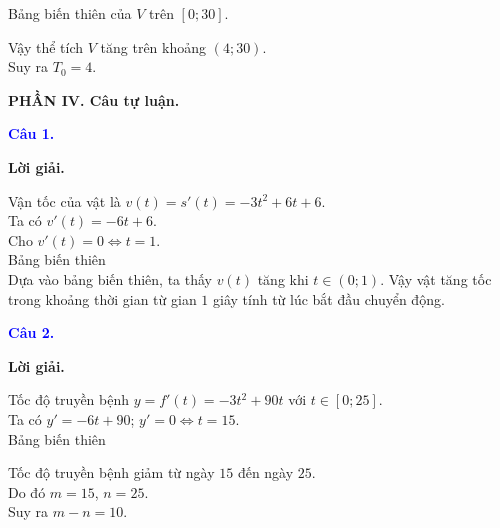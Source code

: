 \documentclass[12pt,a4paper]{article}
\begin{document}
		Bảng biến thiên của $V$ trên $[0;30]$.
		

		Vậy thể tích $V$ tăng trên khoảng $(4;30)$.\\

		Suy ra $T_0=4$.

\medskip
\noindent\textbf{PHẦN IV. Câu tự luận.}

\medskip

\noindent\textcolor{blue}{\textbf{Câu 1.}}

\noindent\textbf{Lời giải.}

Vận tốc của vật là $v(t)=s'(t)=-3t^2+6t+6$.\\

		Ta có $v'(t)=-6t+6$.\\

		Cho $v'(t)=0\Leftrightarrow t=1$.\\

		Bảng biến thiên\\


		Dựa vào bảng biến thiên, ta thấy $v(t)$ tăng khi $t\in (0;1)$. Vậy vật tăng tốc trong khoảng thời gian từ gian $1$ giây tính từ lúc bắt đầu chuyển động.

\medskip
\noindent\textcolor{blue}{\textbf{Câu 2.}}

\noindent\textbf{Lời giải.}

Tốc độ truyền bệnh $y=f'(t)=-3t^2+90t$ với $t\in [0; 25]$.\\

		Ta có $y'=-6t+90$; $y'=0\Leftrightarrow t=15$.\\

		Bảng biến thiên
		

		Tốc độ truyền bệnh giảm từ ngày $15$ đến ngày $25$.\\

		Do đó $m=15$, $n=25$.\\
Suy ra $m-n=10$.

\medskip
\end{document}
